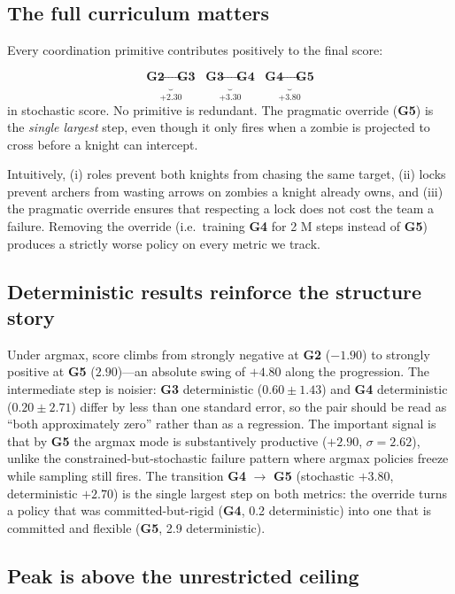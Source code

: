 \documentclass[11pt,a4paper]{article}
\newcommand{\gii}{\textbf{G2}}
\newcommand{\giii}{\textbf{G3}}
\newcommand{\giv}{\textbf{G4}}
\newcommand{\gv}{\textbf{G5}}
\begin{document}
\subsection{The full curriculum matters}

Every coordination primitive contributes positively to the final score:

\[
\underbrace{\gii{} \to \giii{}}_{+2.30}\;
\underbrace{\giii{} \to \giv{}}_{+3.30}\;
\underbrace{\giv{} \to \gv{}}_{+3.80}
\]
in stochastic score. No primitive is redundant. The pragmatic override
(\gv{}) is the \emph{single largest} step, even though it only fires
when a zombie is projected to cross before a knight can intercept.

Intuitively, (i) roles prevent both knights from chasing the same
target, (ii) locks prevent archers from wasting arrows on zombies a
knight already owns, and (iii) the pragmatic override ensures that
respecting a lock does not cost the team a failure. Removing the
override (i.e.\ training \giv{} for 2 M steps instead of \gv{}) produces
a strictly worse policy on every metric we track.

\subsection{Deterministic results reinforce the structure story}

Under argmax, score climbs from strongly negative at \gii{}
($-1.90$) to strongly positive at \gv{} ($2.90$)---an absolute swing of
$+4.80$ along the progression. The intermediate step is noisier:
\giii{} deterministic ($0.60 \pm 1.43$) and \giv{} deterministic
($0.20 \pm 2.71$) differ by less than one standard error, so the pair
should be read as ``both approximately zero'' rather than as a
regression. The important signal is that by \gv{} the argmax mode is
substantively productive ($+2.90$, $\sigma = 2.62$), unlike the
constrained-but-stochastic failure pattern where argmax policies freeze
while sampling still fires. The transition \giv{} $\to$ \gv{}
(stochastic $+3.80$, deterministic $+2.70$) is the single largest step
on both metrics: the override turns a policy that was
committed-but-rigid (\giv{}, 0.2 deterministic) into one that is
committed and flexible (\gv{}, 2.9 deterministic).

\subsection{Peak is above the unrestricted ceiling}
\end{document}
